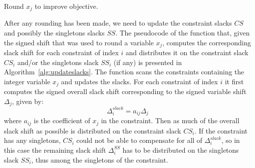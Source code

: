 \documentclass[a4paper,12pt]{book}
\begin{document}
\begin{algorithm}[ht]

	\caption{Round $x_j$ to improve objective.}
	\label{alg:roundxjbestobj}
\end{algorithm}

After any rounding has been made, we need to update the constraint slacks $CS$ and possibly the singletons slacks $SS$. The pseudocode of the function that, given the signed shift that was used to round a variable $x_j$, computes the corresponding slack shift for each constraint of index $i$ and distributes it on the constraint slack $CS_i$ and/or the singletons slack $SS_i$ (if any) is presented in Algorithm~\ref{alg:updateslacks}. The function scans the constraints containing the integer variable $x_j$ and updates the slacks. For each constraint of index $i$ it first computes the signed overall slack shift corresponding to the signed variable shift $\Delta_{j}$, given by:
\begin{equation}
	\Delta_{i}^{slack} = a_{ij} \Delta_{j}
\end{equation}
where $a_{ij}$ is the coefficient of $x_j$ in the constraint. Then as much of the overall slack shift as possible is distributed on the constraint slack $CS_i$. If the constraint has any singletons, $CS_i$ could not be able to compensate for all of $\Delta_{i}^{slack}$, so in this case the remaining slack shift $\Delta_{i}^{SS}$ has to be distributed on the singletons slack $SS_i$, thus among the singletons of the constraint. \par
\end{document}
